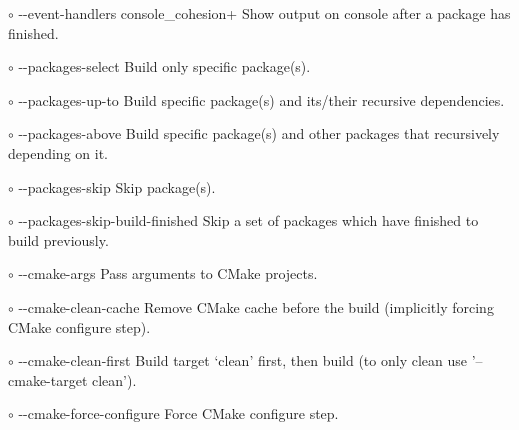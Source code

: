 \documentclass[9pt,a4paper]{article}
\newcommand{\smallhspace}{\-\hspace{0.3cm}}
\newcommand{\terminalfont}[1]{{\sffamily#1}}
\newcommand{\ddash}{-{}-}
\begin{document}
\begin{multicols*}{3}[]
$\circ$ \terminalfont{\ddash event-handlers console\_cohesion+}
\smallhspace
Show output on console after a package has finished.

$\circ$ \terminalfont{\ddash packages-select}
\smallhspace
Build only specific package(s).

$\circ$ \terminalfont{\ddash packages-up-to}
\smallhspace
Build specific package(s) and its/their recursive dependencies.

$\circ$ \terminalfont{\ddash packages-above}
\smallhspace
Build specific package(s) and other packages that recursively depending on it.

$\circ$ \terminalfont{\ddash packages-skip}
\smallhspace
Skip package(s).

$\circ$ \terminalfont{\ddash packages-skip-build-finished}
\smallhspace
Skip a set of packages which have finished to build previously.

$\circ$ \terminalfont{\ddash cmake-args}
\smallhspace
Pass arguments to CMake projects.

$\circ$ \terminalfont{\ddash cmake-clean-cache}
\smallhspace
Remove CMake cache before the build (implicitly forcing CMake configure step).

$\circ$ \terminalfont{\ddash cmake-clean-first}
\smallhspace
Build target `clean' first, then build (to only clean use '--cmake-target clean').

$\circ$ \terminalfont{\ddash cmake-force-configure}
\smallhspace
Force CMake configure step.

\end{multicols*}
\end{document}
